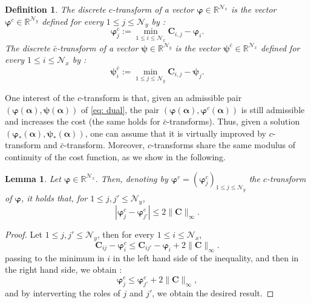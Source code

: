 \documentclass{article}
\def\RR{\mathbb{R}}
\def\cN{\mathcal{N}}
\def\aalpha{\boldsymbol{\alpha}}
\def\pphi{\boldsymbol{\varphi}}
\def\ppsi{\boldsymbol{\psi}}
\def\CC{\mathbf{C}}
\newtheorem{defi}[thm]{Definition}
\newtheorem{lem}[thm]{Lemma}
\begin{document}
%
\begin{defi}\label{def: $c$-transform}
    The discrete $c$-transform of a vector $ \pphi \in \RR^{\cN_x} $ is the vector $ \pphi^c \in \RR^{\cN_y}$ defined for every $1 \leq j \leq \cN_y$ by :
    \begin{equation}
        \pphi^c_j := \min_{1 \leq i \leq \cN_x} \CC_{i,j} - \pphi_i.
    \end{equation}
    The discrete $\bar c$-transform of a vector  $ \ppsi \in \RR^{\cN_y} $ is the vector $ \ppsi^{\bar{c}} \in \RR^{\cN_x}$ defined for every $1 \leq i \leq \cN_x$ by :
    \begin{equation}
        \ppsi^{\bar c}_i := \min_{1 \leq j \leq \cN_y} \CC_{i,j} - \ppsi_j.
    \end{equation}
\end{defi}
%
One interest of the $c$-transform is that, given an admissible pair $(\pphi(\aalpha), \ppsi(\aalpha))$ of  \eqref{eq: dual}, the pair $(\pphi(\aalpha), \pphi^c(\aalpha))$ is still admissible and increases the cost (the same holds for $\bar c$-transforms). Thus, given a solution $(\pphi_*(\aalpha), \ppsi_*(\aalpha))$, one can assume that it is virtually improved by $c$-transform and $\bar c$-transform. Moreover, $c$-transforms share the same modulus of continuity of the cost function, as we show in the following.
%
\begin{lem} \label{lemma: $c$-transform continuity}
    Let $ \pphi \in \RR^{\cN_x} $. Then, denoting by $\pphi^c = (\pphi_j^c)_{1 \leq j \leq \cN_y}$ the $c$-transform of $\pphi$, it holds that, for $1 \leq j, j' \leq \cN_y$,
    \begin{equation}
        | \pphi^c_j - \pphi^c_{j'} | \leq 2 \| \CC \|_\infty.
    \end{equation}
\end{lem}
%
\begin{proof}
    Let $1 \leq j, j' \leq \cN_y$, then for every $1 \leq i \leq \cN_x$, 
    \begin{equation}
        \CC_{ij} - \pphi_i^c \leq \CC_{ij'} - \pphi_i + 2 \| \CC \|_\infty.
    \end{equation}
    passing to the minimum in $i$ in the left hand side of the inequality, and then in the right hand side, we obtain :
    \begin{equation}
        \pphi^c_j \leq \pphi^c_{j'} + 2 \| \CC\|_\infty,
    \end{equation}
    and by interverting the roles of $j$ and $j'$, we obtain the desired result.
\end{proof}
\end{document}
